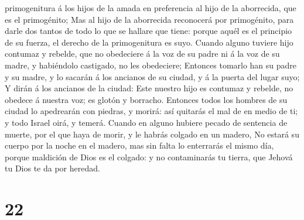 primogenitura á los hijos de la amada en preferencia al hijo de la
aborrecida, que es el primogénito;  Mas al hijo de la
aborrecida reconocerá por primogénito, para darle dos tantos de todo lo
que se hallare que tiene: porque aquél es el principio de su fuerza, el
derecho de la primogenitura es suyo.  Cuando alguno
tuviere hijo contumaz y rebelde, que no obedeciere á la voz de su padre
ni á la voz de su madre, y habiéndolo castigado, no les obedeciere;
 Entonces tomarlo han su padre y su madre, y lo sacarán á
los ancianos de su ciudad, y á la puerta del lugar suyo; 
Y dirán á los ancianos de la ciudad: Este nuestro hijo es contumaz y
rebelde, no obedece á nuestra voz; es glotón y borracho. 
Entonces todos los hombres de su ciudad lo apedrearán con piedras, y
morirá: así quitarás el mal de en medio de ti; y todo Israel oirá, y
temerá.  Cuando en alguno hubiere pecado de sentencia de
muerte, por el que haya de morir, y le habrás colgado en un madero,
 No estará su cuerpo por la noche en el madero, mas sin
falta lo enterrarás el mismo día, porque maldición de Dios es el
colgado: y no contaminarás tu tierra, que Jehová tu Dios te da por
heredad.

\hypertarget{section-21}{%
\section{22}\label{section-21}}


